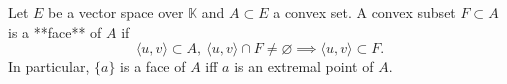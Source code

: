 Let $E$ be a vector space over $\mathbb{K}$ and $A \subset E$ a convex set. A convex subset $F \subset A$ is a **face** of $A$ if
$$\langle u, v \rangle \subset A,\ \langle u, v \rangle \cap F \neq \varnothing \implies \langle u, v \rangle \subset F.$$
In particular, $\{a\}$ is a face of $A$ iff $a$ is an extremal point of $A$.
